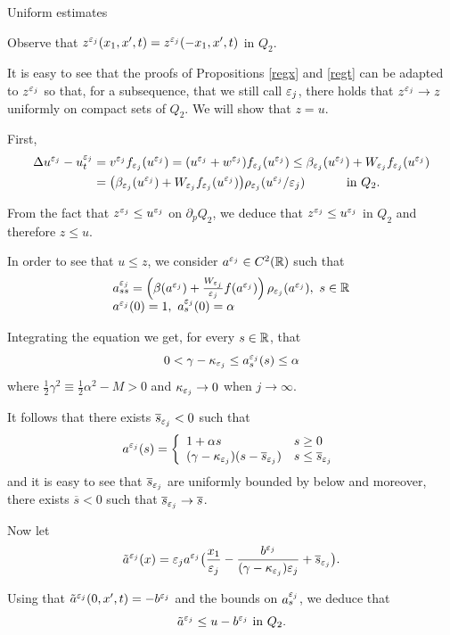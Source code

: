 \begin{section}{Uniform estimates}
\begin{pf}
Observe that $z^{\varepsilon_j}(x_1,x',t) = z^{\varepsilon_j}(-x_1,x',t)$ in $Q_2$.

It is easy to see that the proofs of Propositions \ref{regx} and \ref{regt}
can be adapted to $z^{\varepsilon_j}$
so that, for a subsequence, that we still call ${\varepsilon_j}$, there holds that
$z^{\varepsilon_j}\to z$ uniformly on compact sets of $Q_2$.
We will show that $z = u$.

First,
\begin{align*}
\Delta u^{\varepsilon_j}-u^{\varepsilon_j}_t &=v^{\varepsilon_j} f_{{\varepsilon_j}}(u^{\varepsilon_j})=(u^{\varepsilon_j}+w^{\varepsilon_j}) f_{{\varepsilon_j}}(u^{\varepsilon_j}) \le 
\beta_{{\varepsilon_j}}(u^{\varepsilon_j})+W_{{\varepsilon_j}} f_{{\varepsilon_j}}(u^{\varepsilon_j})  \\
&=\big(\beta_{{\varepsilon_j}}(u^{\varepsilon_j})+W_{{\varepsilon_j}} f_{{\varepsilon_j}}(u^{\varepsilon_j})\big) \rho_{{\varepsilon_j}}(u^{\varepsilon_j}/{\varepsilon_j})
 \quad\qquad\mbox{ in } Q_2.
\end{align*}


From the fact that $z^{\varepsilon_j}\le u^{\varepsilon_j}$ on $\partial_p Q_2$,
we deduce that $z^{\varepsilon_j}\le u^{\varepsilon_j}$ in $Q_2$ and therefore $z\le u$.

In order to see that $u\le z$, we consider $a^{\varepsilon_j}\in C^2({\Bbb R})$ such that 
$$\begin{array}{l}
a^{\varepsilon_j}_{ss} = \left(\beta(a^{\varepsilon_j}) + \frac{W_{\varepsilon_j}}{\varepsilon_j} f(a^{\varepsilon_j})
\right)\rho_{\varepsilon_j}(a^{\varepsilon_j}),\ s\in{\Bbb R}\\
a^{\varepsilon_j}(0) = 1,\ a^{\varepsilon_j}_s(0) = \alpha
\end{array}$$

Integrating the equation we get, for every $s\in{\Bbb R}$, that
$$0<\gamma - \kappa_{\varepsilon_j}\le a^{\varepsilon_j}_s(s)\le \alpha$$
where $\frac12 \gamma^2 \equiv \frac12 \alpha^2 - M >0$ and 
$\kappa_{\varepsilon_j}\to 0$ when $j\to\infty$.

It follows that there exists $\overline{s}_{\varepsilon_j}<0$ such that
$$a^{\varepsilon_j}(s) = \left\{\begin{array}{ll}
1+\alpha s & s\ge0\\
(\gamma - \kappa_{\varepsilon_j})(s-\overline{s}_{\varepsilon_j}) & s\le\overline{s}_{\varepsilon_j}
\end{array}\right.$$
and it is easy to see that $\overline{s}_{\varepsilon_j}$ are uniformly bounded by 
below and moreover, there exists $\overline{s}<0$ such that
$\overline{s}_{\varepsilon_j}\to\overline{s}$.

Now let
$$\tilde{a}^{\varepsilon_j}(x) = \varepsilon_j a^{\varepsilon_j}\big(\frac{x_1}{\varepsilon_j} - 
\frac{b^{\varepsilon_j}}{(\gamma - \kappa_{\varepsilon_j})\varepsilon_j} + \overline{s}_{\varepsilon_j}\big).$$

Using that $\tilde{a}^{\varepsilon_j}(0,x',t) = -b^{\varepsilon_j}$ and the bounds on 
$a^{\varepsilon_j}_s$, we deduce that
$$\tilde{a}^{\varepsilon_j}\le u - b^{\varepsilon_j} \mbox{ in } Q_2.$$


\end{pf}
\end{section}
